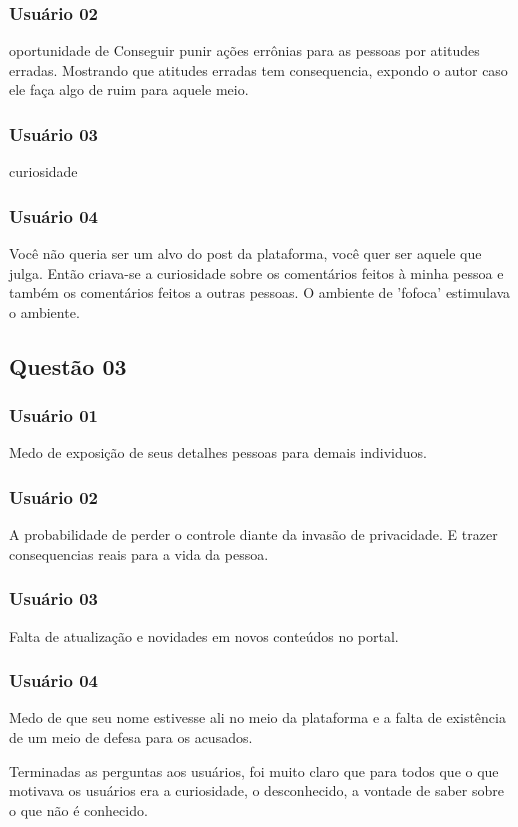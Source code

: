 \subsubsection{Usuário 02}
oportunidade de Conseguir punir ações errônias para as pessoas por atitudes erradas.
Mostrando que atitudes erradas tem consequencia, expondo o autor caso ele faça
algo de ruim para aquele meio.
\subsubsection{Usuário 03}
curiosidade
\subsubsection{Usuário 04}
Você não queria ser um alvo do post da plataforma, você quer ser aquele que julga.
Então criava-se a curiosidade sobre os comentários feitos à minha pessoa e também
os comentários feitos a outras pessoas. O ambiente de 'fofoca' estimulava o ambiente.

\subsection{Questão 03}
\subsubsection{Usuário 01}
Medo de exposição de seus detalhes pessoas para demais individuos.
\subsubsection{Usuário 02}
A probabilidade de perder o controle diante da invasão de privacidade. E trazer
consequencias reais para a vida da pessoa.
\subsubsection{Usuário 03}
Falta de atualização e novidades em novos conteúdos no portal.
\subsubsection{Usuário 04}
Medo de que seu nome estivesse ali no meio da plataforma e a falta de existência
de um meio de defesa para os acusados.

Terminadas as perguntas aos usuários, foi muito claro que para todos que o que motivava
os usuários era a curiosidade, o desconhecido, a vontade de saber sobre o que
não é conhecido.

